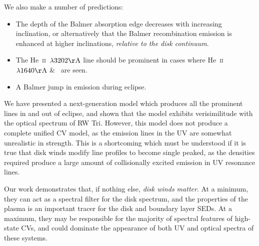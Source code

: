 \documentclass[preprint, a4paper, 11pt]{aastex}
\begin{document}
\noindent We also make a number of predictions:

\begin{itemize}
	\item The depth of the Balmer absorption edge decreases with increasing inclination,
or alternatively that the Balmer recombination emission
is enhanced at higher inclinations, {\sl relative to the disk continuum}.
	\item The He~\textsc{ii}~$\lambda3202{\rm \AA}$ line should be
prominent in cases where He~\textsc{ii}~$\lambda1640{\rm \AA}$ \& 
\heiiopt\ are seen. 
	\item A Balmer jump in emission during eclipse.
\end{itemize}

\smallskip
We have presented a next-generation model
which produces all the prominent lines in and out of eclipse, and
shown that the model exhibits verisimilitude with the optical spectrum of RW Tri.
However, this model does not produce a complete unified CV model, as
the emission lines in the UV are somewhat unrealistic in strength.
This is a shortcoming which must be understood if it is true that
disk winds modify line profiles to become single peaked, as the 
densities required produce a large amount of collisionally excited emission
in UV resonance lines.

Our work demonstrates that, if nothing else,
{\sl disk winds matter}. At a minimum,
they can act as a spectral filter
for the disk spectrum, and the properties of the plasma
is an important tracer for the disk and boundary layer SEDs. 
At a maximum, they may be responsible
for the majority of spectral features of high-state CVs,
and could dominate the appearance of both UV and optical
spectra of these systems.








\end{document}
